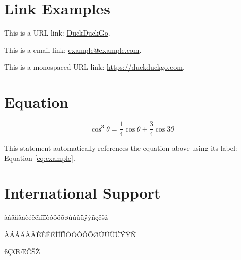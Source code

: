 \documentclass[
	letterpaper, %
	12pt, %
]{CSSullivanBusinessReport}
\begin{document}

\section{Link Examples}

This is a URL link: \href{https://www.duckduckgo.com}{DuckDuckGo}.

This is a email link: \href{mailto:example@example.com}{example@example.com}.

This is a monospaced URL link: \url{https://duckduckgo.com}.


\section{Equation}

\begin{equation}
	\cos^3 \theta =\frac{1}{4}\cos\theta+\frac{3}{4}\cos 3\theta
	\label{eq:example}
\end{equation}

This statement automatically references the equation above using its label: Equation \ref{eq:example}.


\section{International Support}

àáâäãåèéêëìíîïòóôöõøùúûüÿýñçčšž

ÀÁÂÄÃÅÈÉÊËÌÍÎÏÒÓÔÖÕØÙÚÛÜŸÝÑ

ßÇŒÆČŠŽ

\end{document}
